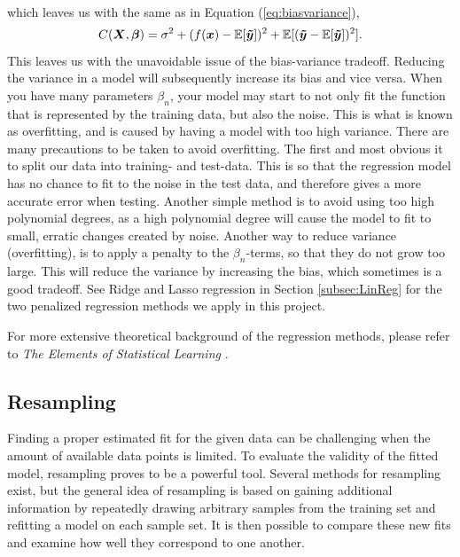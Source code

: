 \documentclass[a4paper, 10pt]{article}
\begin{document}
\begin{multicols}{2}
\begin{align*}
\end{align*}
which leaves us with the same as in Equation (\ref{eq:biasvariance}),
\begin{equation*}
C(\bm{X},\bm{\beta} ) =  \sigma^2 +  ( f(\bm{x}) -\mathbb{E}[\bm{\tilde{y}}]  )^2  +\mathbb{E}[(\bm{\tilde{y}} -\mathbb{E}[\bm{\tilde{y}}])^2]. \\
\end{equation*}
This leaves us with the unavoidable issue of the bias-variance tradeoff. Reducing the variance in a model will subsequently increase its bias and vice versa.
When you have many parameters $\beta_n$, your model may start to not only fit the function that is represented by the training data, but also the noise. This is what is known as overfitting, and is caused by having a model with too high variance. There are many precautions to be taken to avoid overfitting. The first and most obvious it to split our data into training- and test-data. This is so that the regression model has no chance to fit to the noise in the test data, and therefore gives a more accurate error when testing. Another simple method is to avoid using too high polynomial degrees, as a high polynomial degree will cause the model to fit to small, erratic changes created by noise.
Another way to reduce variance (overfitting), is to apply a penalty to the $\beta_n$-terms, so that they do not grow too large. This will reduce the variance by increasing the bias, which sometimes is a good tradeoff. See Ridge and Lasso regression in Section \ref{subsec:LinReg} for the two penalized regression methods we apply in this project.

For more extensive theoretical background of the regression methods, please refer to \textit{The Elements of Statistical Learning} \cite{hastie}.
\subsection{Resampling}
Finding a proper estimated fit for the given data can be challenging when the amount of available data points is limited. To evaluate the validity of the fitted model, resampling proves to be a powerful tool. Several methods for resampling exist, but the general idea of resampling is based on gaining additional information by repeatedly drawing arbitrary samples from the training set and refitting a model on each sample set. It is then possible to compare these new fits and examine how well they correspond to one another.


\end{multicols}
\end{document}
